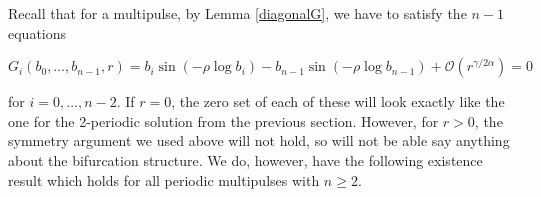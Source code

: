 \documentclass[thesis.tex]{subfiles}
\begin{document}
Recall that for a multipulse, by Lemma \ref{diagonalG}, we have to satisfy the $n-1$ equations

\begin{equation*}
G_i(b_0, \dots, b_{n-1}, r) = b_i \sin \left( -\rho \log b_i \right) - b_{n-1} \sin \left( -\rho \log b_{n-1} \right) + \mathcal{O}(r^{\gamma / 2 \alpha}) = 0
\end{equation*}

for $i = 0, \dots, n-2$. If $r = 0$, the zero set of each of these will look exactly like the one for the 2-periodic solution from the previous section. However, for $r > 0$, the symmetry argument we used above will not hold, so will not be able say anything about the bifurcation structure. We do, however, have the following existence result which holds for all periodic multipulses with $n \geq 2$.
\end{document}
